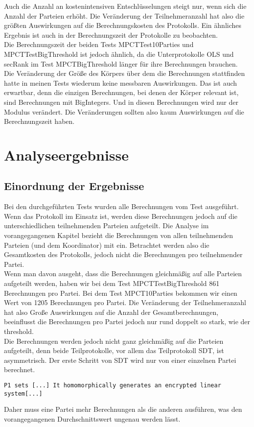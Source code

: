 Auch die Anzahl an kostenintensiven Entschlüsselungen steigt nur, wenn sich die Anzahl der Parteien erhöht. Die Veränderung der Teilnehmeranzahl hat also die größten Auswirkungen auf die Berechnungskosten des Protokolls. Ein ähnliches Ergebnis ist auch in der Berechnungszeit der Protokolle zu beobachten.\\
Die Berechnungszeit der beiden Tests MPCTTest10Parties und MPCTTestBigThreshold ist jedoch ähnlich, da die Unterprotokolle OLS und secRank im Test MPCTBigThreshold länger für ihre Berechnungen brauchen.\\
Die Veränderung der Größe des Körpers über dem die Berechnungen stattfinden hatte 
in meinen Tests wiederum keine messbaren Auswirkungen. Das ist auch erwartbar, denn die einzigen Berechnungen, bei denen der Körper relevant ist, sind Berechnungen mit BigIntegers. Und in diesen Berechnungen wird nur der Modulus verändert. Die Veränderungen sollten also kaum Auswirkungen auf die Berechnungszeit haben.\\


\section{Analyseergebnisse}
\subsection{Einordnung der Ergebnisse}
Bei den durchgeführten Tests wurden alle Berechnungen vom Test ausgeführt. Wenn das Protokoll im Einsatz ist, werden diese Berechnungen jedoch auf die unterschiedlichen teilnehmenden Parteien aufgeteilt. Die Analyse im vorangegangenen Kapitel bezieht die Berechnungen von allen teilnehmenden Parteien (und dem Koordinator) mit ein. Betrachtet werden also die Gesamtkosten des Protokolls, jedoch nicht die Berechnungen pro teilnehmender Partei.\\
Wenn man davon ausgeht, dass die Berechnungen gleichmäßig auf alle Parteien aufgeteilt werden, haben wir bei dem Test MPCTTestBigThreshold 861 Berechnungen pro Partei. Bei dem Test MPCT10Parties bekommen wir einen Wert von 1205 Berechnungen pro Partei. Die Veränderung der Teilnehmeranzahl hat also Große Auswirkungen auf die Anzahl der Gesamtberechnungen, beeinflusst die Berechnungen pro Partei jedoch nur rund doppelt so stark, wie der threshold.\\
Die Berechnungen werden jedoch nicht ganz gleichmäßig auf die Parteien aufgeteilt, denn beide Teilprotokolle, vor allem das Teilprotokoll SDT, ist asymmetrisch. Der erste Schritt von SDT wird nur von einer einzelnen Partei berechnet. 
\begin{lstlisting}[caption = Ausschnitt des Teilprotokolls SDT \cite{Doettling2021}]
P1 sets [...] It homomorphically generates an encrypted linear system[...]
\end{lstlisting}
Daher muss eine Partei mehr Berechnungen als die anderen ausführen, was den vorangegangenen Durchschnittswert ungenau werden lässt.


